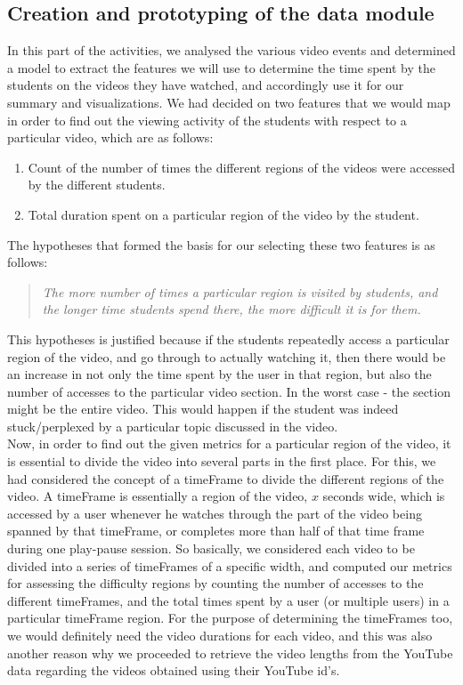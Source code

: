 \documentclass[16pt]{report}
\begin{document}
\subsection{Creation and prototyping of the data module}

In this part of the activities, we analysed the various video events and determined a model to extract the features we will use to determine the time spent by the students on the videos they have watched, and accordingly use it for our summary and visualizations. We had decided on two features that we would map in order to find out the viewing activity of the students with respect to a particular video, which are as follows:

\begin{enumerate}
\item Count of the number of times the different regions of the videos were accessed by the different students.
\item Total duration spent on a particular region of the video by the student.
\end{enumerate}

The hypotheses that formed the basis for our selecting these two features is as follows:

\begin{verse}
\emph{The more number of times a particular region is visited by students, and the longer time students spend there, the more difficult it is for them.}
\end{verse}

This hypotheses is justified because if the students repeatedly access a particular region of the video, and go through to actually watching it, then there would be an increase in not only the time spent by the user in that region, but also the number of accesses to the particular video section. In the worst case - the section might be the entire video. This would happen if the student was indeed stuck/perplexed by a particular topic discussed in the video.\\

Now, in order to find out the given metrics for a particular region of the video, it is essential to divide the video into several parts in the first place. For this, we had considered the concept of a timeFrame to divide the different regions of the video. A timeFrame is essentially a region of the video, $x$ seconds wide, which is accessed by a user whenever he watches through the part of the video being spanned by that timeFrame, or completes more than half of that time frame during one play-pause session. So basically, we considered each video to be divided into a series of timeFrames of a specific width, and computed our metrics for assessing the difficulty regions by counting the number of accesses to the different timeFrames, and the total times spent by a user (or multiple users) in a particular timeFrame region. For the purpose of determining the timeFrames too, we would definitely need the video durations for each video, and this was also another reason why we proceeded to retrieve the video lengths from the YouTube data regarding the videos obtained using their YouTube id's. \\
\end{document}

